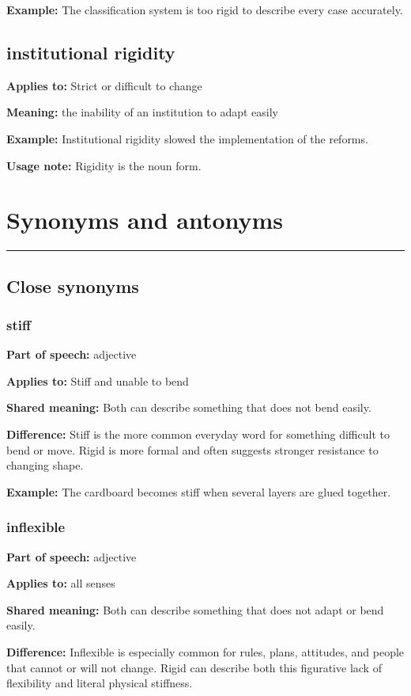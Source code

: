 \documentclass[11pt]{article}
\newcommand{\sectionrule}{\par\vspace{-0.5em}\noindent\textcolor{Accent}{\rule{\linewidth}{0.6pt}}\par}
\begin{document}
\textbf{Example:} The classification system is too rigid to describe every case accurately.

\subsection{institutional rigidity}
\textbf{Applies to:} Strict or difficult to change

\textbf{Meaning:} the inability of an institution to adapt easily

\textbf{Example:} Institutional rigidity slowed the implementation of the reforms.

\textbf{Usage note:} Rigidity is the noun form.

\section{Synonyms and antonyms}
\sectionrule
\subsection{Close synonyms}
\subsubsection{stiff}
\textbf{Part of speech:} adjective

\textbf{Applies to:} Stiff and unable to bend

\textbf{Shared meaning:} Both can describe something that does not bend easily.

\textbf{Difference:} Stiff is the more common everyday word for something difficult to bend or move. Rigid is more formal and often suggests stronger resistance to changing shape.

\textbf{Example:} The cardboard becomes stiff when several layers are glued together.

\subsubsection{inflexible}
\textbf{Part of speech:} adjective

\textbf{Applies to:} all senses

\textbf{Shared meaning:} Both can describe something that does not adapt or bend easily.

\textbf{Difference:} Inflexible is especially common for rules, plans, attitudes, and people that cannot or will not change. Rigid can describe both this figurative lack of flexibility and literal physical stiffness.
\end{document}
